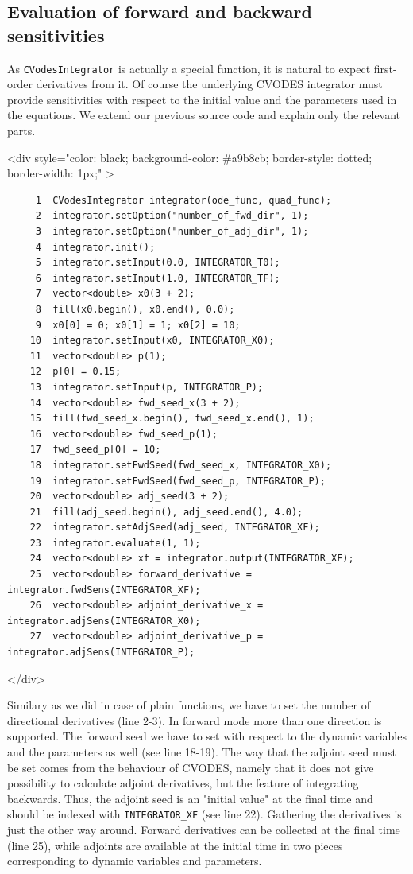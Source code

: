 \documentclass[a4paper,12pt]{book}
\newcommand{\codebegin}{
\begin{rawhtml}
<div style="color: black; background-color: \#a9b8cb;  border-style: dotted; border-width: 1px;" >
\end{rawhtml}
}
\newcommand{\codeend}{
\begin{rawhtml}
</div>
\end{rawhtml}
}
\newcommand{\codebegin}{

}
\newcommand{\codeend}{

}
\begin{document}
{\subsection*{Evaluation of forward and backward sensitivities}
As \texttt{CVodesIntegrator} is actually a special function, it is natural to expect first-order derivatives from it. Of course the underlying CVODES integrator must
provide sensitivities with respect to the initial value and the parameters used in the equations. We extend our previous source code and explain only the relevant parts.
\par
\codebegin
\begin{verbatim}
     1  CVodesIntegrator integrator(ode_func, quad_func);
     2  integrator.setOption("number_of_fwd_dir", 1);
     3  integrator.setOption("number_of_adj_dir", 1);
     4  integrator.init();
     5  integrator.setInput(0.0, INTEGRATOR_T0);
     6  integrator.setInput(1.0, INTEGRATOR_TF);
     7  vector<double> x0(3 + 2);
     8  fill(x0.begin(), x0.end(), 0.0);
     9  x0[0] = 0; x0[1] = 1; x0[2] = 10;
    10  integrator.setInput(x0, INTEGRATOR_X0);
    11  vector<double> p(1);
    12  p[0] = 0.15;
    13  integrator.setInput(p, INTEGRATOR_P);
    14  vector<double> fwd_seed_x(3 + 2);
    15  fill(fwd_seed_x.begin(), fwd_seed_x.end(), 1);
    16  vector<double> fwd_seed_p(1);
    17  fwd_seed_p[0] = 10;
    18  integrator.setFwdSeed(fwd_seed_x, INTEGRATOR_X0);
    19  integrator.setFwdSeed(fwd_seed_p, INTEGRATOR_P);
    20  vector<double> adj_seed(3 + 2);
    21  fill(adj_seed.begin(), adj_seed.end(), 4.0);
    22  integrator.setAdjSeed(adj_seed, INTEGRATOR_XF);
    23  integrator.evaluate(1, 1);
    24  vector<double> xf = integrator.output(INTEGRATOR_XF);
    25  vector<double> forward_derivative = integrator.fwdSens(INTEGRATOR_XF);
    26  vector<double> adjoint_derivative_x = integrator.adjSens(INTEGRATOR_X0);
    27  vector<double> adjoint_derivative_p = integrator.adjSens(INTEGRATOR_P);
\end{verbatim}
\codeend
Similary as we did in case of plain functions, we have to set the number of directional derivatives (line 2-3). In
forward mode more than one direction is supported. The forward seed we have to set with respect to the dynamic variables and the parameters as well 
(see line 18-19). The way that the adjoint seed must be set comes from the behaviour of CVODES, namely that it does not give possibility to 
calculate adjoint derivatives, but the feature of integrating backwards. Thus, the adjoint seed is an "initial value" at the final time 
and should be indexed with \texttt{INTEGRATOR\_XF} (see line 22). Gathering the derivatives is just the other way around. Forward derivatives can
be collected at the final time (line 25), while adjoints are available at the initial time in two pieces corresponding to dynamic variables and parameters.
}
\end{document}
